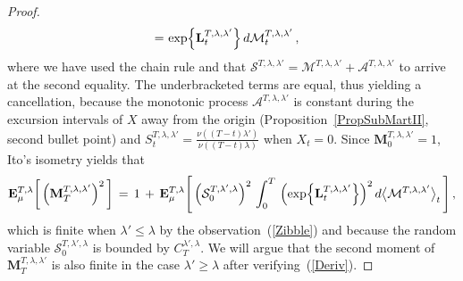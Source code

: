 \documentclass[10pt]{article}
\numberwithin{equation}{section}
\theoremstyle{definition}
\begin{document}
\begin{proof}
\begin{align}
\,=\,&  \, \textup{exp}\Big\{\mathbf{L}_{t}^{T,\lambda,\lambda'}  \Big\}\,d\mathcal{M}_{t}^{T,\lambda,\lambda'} \,,
\end{align}
where we have used the chain rule and that $\mathcal{S}^{T,\lambda,\lambda'}=\mathcal{M}^{T,\lambda,\lambda'}+\mathcal{A}^{T,\lambda,\lambda'}$  to arrive at the second equality.
The underbracketed terms are equal, thus yielding a cancellation,  because  the monotonic process $\mathcal{A}^{T,\lambda ,\lambda'} $ is constant during the excursion intervals of  $X$ away from the origin (Proposition~\ref{PropSubMartII}, second bullet point) and    $S_{t}^{T,\lambda,\lambda'}=\frac{\nu((T-t) \lambda')  }{\nu((T-t)\lambda )  }$  when $X_t=0$. Since $\mathbf{M}^{T,\lambda,\lambda'}_0=1$,  Ito's isometry yields that 
\begin{align*}
\mathbf{E}^{T,\lambda}_{\mu}\bigg[ \,\Big( \mathbf{M}^{T,\lambda,\lambda'}_T\Big)^2 \,\bigg]\,=\, 1\,+\, \mathbf{E}^{T,\lambda}_{\mu}\Bigg[\,\Big(\mathcal{S}_{0}^{T,\lambda' ,\lambda}\Big)^2\,\int_0^{T} \,\Big( \textup{exp}\Big\{\mathbf{L}_{t}^{T,\lambda ,\lambda'}  \Big\}\Big)^2 \,  d  \big\langle \mathcal{M}^{T,\lambda ,\lambda'}\big\rangle_t \,\Bigg]\,,
\end{align*}
which is finite when $\lambda'\leq \lambda$ by the observation~(\ref{Zibble}) and because the random variable $\mathcal{S}_{0}^{T,\lambda' ,\lambda}$ is bounded by $C_T^{\lambda',\lambda}$.  We will argue that the second moment of $\mathbf{M}^{T,\lambda,\lambda'}_T$ is also finite in the case $\lambda'\geq \lambda$ after verifying~(\ref{Deriv}). \vspace{.2cm} 



\end{proof}
\end{document}
